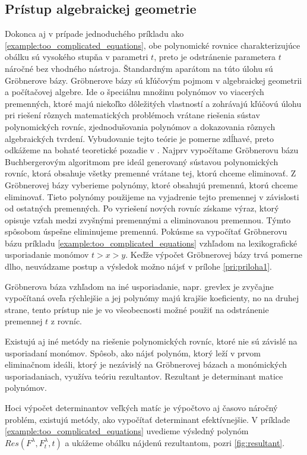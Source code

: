 \subsection{Prístup algebraickej geometrie}
Dokonca aj v prípade jednoduchého príkladu ako \ref{example:too_complicated_equations}, obe polynomické rovnice charakterizujúce obálku sú vysokého stupňa v parametri $t$, preto je odstránenie parametera $t$ náročné bez vhodného nástroja. Štandardným aparátom na túto úlohu sú Gröbnerove bázy. Gröbnerove bázy sú kľúčovým pojmom v algebraickej geometrii a počítačovej algebre. Ide o špeciálnu množinu polynómov vo viacerých premenných, ktoré majú niekoľko dôležitých vlastností a zohrávajú kľúčovú úlohu pri riešení rôznych matematických problémoch vrátane riešenia sústav polynomických rovníc, zjednodušovania polynómov a dokazovania rôznych algebraických tvrdení. Vybudovanie tejto teórie je pomerne zdĺhavé, preto odkážeme na bohaté teoretické pozadie v \cite{Chalm}.
Najprv vypočítame Gröbnerovu bázu Buchbergerovým algoritmom pre ideál generovaný sústavou polynomických rovníc, ktorá obsahuje všetky premenné vrátane tej, ktorú chceme eliminovať. Z Gröbnerovej bázy vyberieme polynómy, ktoré obsahujú premennú, ktorú chceme eliminovať. Tieto polynómy použijeme na vyjadrenie tejto premennej v závislosti od ostatných premenných. Po vyriešení nových rovníc získame výraz, ktorý opisuje vzťah medzi zvyšnými premennými a eliminovanou premennou. Týmto spôsobom úspešne eliminujeme premennú.
Pokúsme sa vypočítať Gröbnerovu bázu príkladu \ref{example:too_complicated_equations} vzhľadom na lexikografické usporiadanie monómov $t > x > y $. Keďže výpočet Gröbnerovej bázy trvá pomerne dlho, neuvádzame postup a výsledok možno nájsť v prílohe \ref{pri:priloha1}.

Gröbnerova báza vzhľadom na iné usporiadanie, napr. grevlex je zvyčajne vypočítaná oveľa rýchlejšie a jej polynómy majú krajšie koeficienty, no na druhej strane, tento prístup nie je vo všeobecnosti možné použiť na odstránenie premennej $t$ z rovníc. 

Existujú aj iné metódy na riešenie polynomických rovníc, ktoré nie sú závislé na usporiadaní monómov. 
Spôsob, ako nájsť polynóm, ktorý leží v prvom eliminačnom ideáli, ktorý je nezávislý na Gröbnerovej bázach a monómických usporiadaniach, využíva teóriu rezultantov. Rezultant je determinant matice polynómov.

Hoci výpočet determinantov veľkých matíc je výpočtovo aj časovo náročný problém, existujú metódy, ako  vypočítať determinant efektívnejšie. V príklade \ref{example:too_complicated_equations} uvedieme výsledný polynóm $Res(F^\lambda , F_t^\lambda , t)$ a ukážeme obálku nájdenú rezultantom, pozri \ref{fig:resultant}. 

